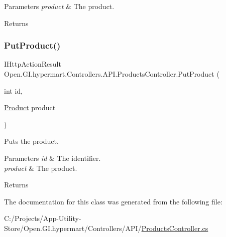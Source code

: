 \begin{DoxyParams}{Parameters}
{\em product} & The product.\\
\hline
\end{DoxyParams}
\begin{DoxyReturn}{Returns}

\end{DoxyReturn}
\hypertarget{class_open_1_1_g_i_1_1hypermart_1_1_controllers_1_1_a_p_i_1_1_products_controller_a13a51589f39ed8e1f7e6b0de1a969ac5}{}\label{class_open_1_1_g_i_1_1hypermart_1_1_controllers_1_1_a_p_i_1_1_products_controller_a13a51589f39ed8e1f7e6b0de1a969ac5} 
\subsubsection{\texorpdfstring{Put\+Product()}{PutProduct()}}
{\footnotesize\ttfamily I\+Http\+Action\+Result Open.\+G\+I.\+hypermart.\+Controllers.\+A\+P\+I.\+Products\+Controller.\+Put\+Product (\begin{DoxyParamCaption}\item[{int}]{id,  }\item[{\hyperlink{class_open_1_1_g_i_1_1hypermart_1_1_models_1_1_product}{Product}}]{product }\end{DoxyParamCaption})}



Puts the product. 


\begin{DoxyParams}{Parameters}
{\em id} & The identifier.\\
\hline
{\em product} & The product.\\
\hline
\end{DoxyParams}
\begin{DoxyReturn}{Returns}

\end{DoxyReturn}


The documentation for this class was generated from the following file\+:\begin{DoxyCompactItemize}
\item 
C\+:/\+Projects/\+App-\/\+Utility-\/\+Store/\+Open.\+G\+I.\+hypermart/\+Controllers/\+A\+P\+I/\hyperlink{_a_p_i_2_products_controller_8cs}{Products\+Controller.\+cs}\end{DoxyCompactItemize}
